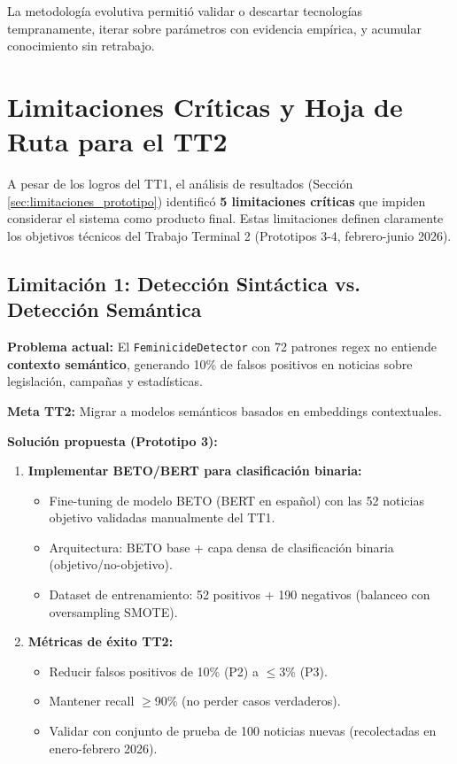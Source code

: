 La metodología evolutiva permitió validar o descartar tecnologías tempranamente, iterar sobre parámetros con evidencia empírica, y acumular conocimiento sin retrabajo.

\section{Limitaciones Críticas y Hoja de Ruta para el TT2}
\label{sec:trabajo_futuro}

A pesar de los logros del TT1, el análisis de resultados (Sección \ref{sec:limitaciones_prototipo}) identificó \textbf{5 limitaciones críticas} que impiden considerar el sistema como producto final. Estas limitaciones definen claramente los objetivos técnicos del Trabajo Terminal 2 (Prototipos 3-4, febrero-junio 2026).

\subsection{Limitación 1: Detección Sintáctica vs. Detección Semántica}
\label{subsec:lim1_semantica}

\textbf{Problema actual:} El \texttt{FeminicideDetector} con 72 patrones regex no entiende \textbf{contexto semántico}, generando 10\% de falsos positivos en noticias sobre legislación, campañas y estadísticas.

\textbf{Meta TT2:} Migrar a modelos semánticos basados en embeddings contextuales.

\textbf{Solución propuesta (Prototipo 3):}
\begin{enumerate}
    \item \textbf{Implementar BETO/BERT para clasificación binaria:}
    \begin{itemize}
        \item Fine-tuning de modelo BETO (BERT en español) con las 52 noticias objetivo validadas manualmente del TT1.
        \item Arquitectura: BETO base + capa densa de clasificación binaria (objetivo/no-objetivo).
        \item Dataset de entrenamiento: 52 positivos + 190 negativos (balanceo con oversampling SMOTE).
    \end{itemize}
    
    \item \textbf{Métricas de éxito TT2:}
    \begin{itemize}
        \item Reducir falsos positivos de 10\% (P2) a $\leq$3\% (P3).
        \item Mantener recall $\geq$90\% (no perder casos verdaderos).
        \item Validar con conjunto de prueba de 100 noticias nuevas (recolectadas en enero-febrero 2026).
    \end{itemize}
\end{enumerate}


